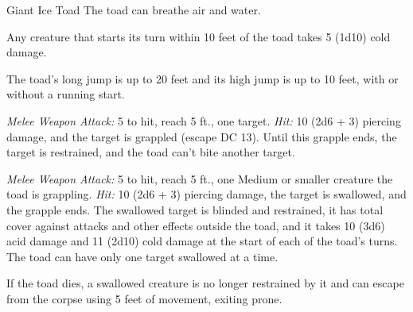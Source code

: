 \documentclass[10pt,a4paper,twoside,bg=print,twocolumn,openany,nodeprecatedcode]{dndbook}
\begin{document}
\begin{DndMonster}[float=t]{Giant Ice Toad}
\DndMonsterBasics[
armor-class = {14 (natural armor)},
hit-points = {\DndDice{7d10 + 14}},
speed = {30 ft.}
]
\DndMonsterAbilityScores[
 str = 16,
 dex = 13,
 con = 14,
 int = 8,
 wis = 10,
 cha = 6
]
\DndMonsterDetails[
damage-immunities = {cold},
senses = {darkvision 60 ft., passive perception 10},
languages = {Ice Toad},
challenge = 3,
]
The toad can breathe air and water.

Any creature that starts its turn within 10 feet of the toad takes 5 (1d10) cold damage.

The toad's long jump is up to 20 feet and its high jump is up to 10 feet, with or without a running start.

\textsl{Melee Weapon Attack:} 5 to hit, reach 5 ft., one target. \textsl{Hit:} 10 (2d6 + 3) piercing damage, and the target is grappled (escape DC 13). Until this grapple ends, the target is restrained, and the toad can't bite another target.

\textsl{Melee Weapon Attack:} 5 to hit, reach 5 ft., one Medium or smaller creature the toad is grappling. \textsl{Hit:} 10 (2d6 + 3) piercing damage, the target is swallowed, and the grapple ends. The swallowed target is blinded and restrained, it has total cover against attacks and other effects outside the toad, and it takes 10 (3d6) acid damage and 11 (2d10) cold damage at the start of each of the toad's turns. The toad can have only one target swallowed at a time.

If the toad dies, a swallowed creature is no longer restrained by it and can escape from the corpse using 5 feet of movement, exiting prone.

\end{DndMonster}
\end{document}
